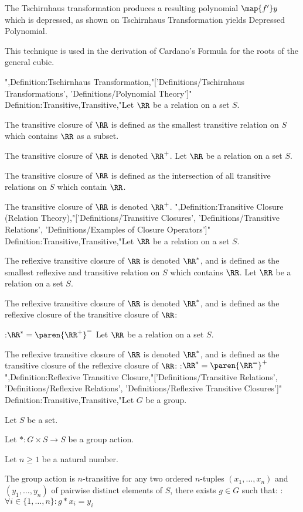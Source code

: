 The Tschirnhaus transformation produces a resulting polynomial $\map {f'} y$ which is depressed, as shown on Tschirnhaus Transformation yields Depressed Polynomial.

This technique is used in the derivation of Cardano's Formula for the roots of the general cubic.

",Definition:Tschirnhaus Transformation,"['Definitions/Tschirnhaus Transformations', 'Definitions/Polynomial Theory']"
Definition:Transitive,Transitive,"Let $\RR$ be a relation on a set $S$.


The transitive closure of $\RR$ is defined as the smallest transitive relation on $S$ which contains $\RR$ as a subset.


The transitive closure of $\RR$ is denoted $\RR^+$.
Let $\RR$ be a relation on a set $S$.


The transitive closure of $\RR$ is defined as the intersection of all transitive relations on $S$ which contain $\RR$.


The transitive closure of $\RR$ is denoted $\RR^+$.
",Definition:Transitive Closure (Relation Theory),"['Definitions/Transitive Closures', 'Definitions/Transitive Relations', 'Definitions/Examples of Closure Operators']"
Definition:Transitive,Transitive,"Let $\RR$ be a relation on a set $S$.

The reflexive transitive closure of $\RR$ is denoted $\RR^*$, and is defined as the smallest reflexive and transitive relation on $S$ which contains $\RR$.
Let $\RR$ be a relation on a set $S$.

The reflexive transitive closure of $\RR$ is denoted $\RR^*$, and is defined as the reflexive closure of the transitive closure of $\RR$:

:$\RR^* = \paren {\RR^+}^=$
Let $\RR$ be a relation on a set $S$.

The reflexive transitive closure of $\RR$ is denoted $\RR^*$, and is defined as the transitive closure of the reflexive closure of $\RR$:
:$\RR^* = \paren {\RR^=}^+$
",Definition:Reflexive Transitive Closure,"['Definitions/Transitive Relations', 'Definitions/Reflexive Relations', 'Definitions/Reflexive Transitive Closures']"
Definition:Transitive,Transitive,"Let $G$ be a group.

Let $S$ be a set.

Let $*: G \times S \to S$ be a group action.

Let $n\geq1$ be a natural number.


The group action is $n$-transitive  for any two ordered $n$-tuples $(x_1, \ldots, x_n)$ and $(y_1, \ldots, y_n)$ of pairwise distinct elements of $S$, there exists $g\in G$ such that:
:$\forall i\in \{1, \ldots, n\} : g * x_i = y_i$


